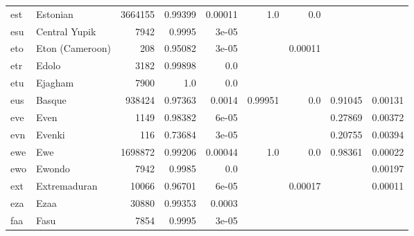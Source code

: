 \documentclass[11pt]{article}
\begin{document}
\begin{table*}[h]
{\begin{tabular}{llrrrrrrr}
est         & Estonian         & 3664155         & 0.99399         & 0.00011         & 1.0         & 0.0         &          &          \\

esu         & Central Yupik         & 7942         & 0.9995         & 3e-05         &          &          &          &          \\

eto         & Eton (Cameroon)         & 208         & 0.95082         & 3e-05         &          & 0.00011         &          &          \\

etr         & Edolo         & 3182         & 0.99898         & 0.0         &          &          &          &          \\

etu         & Ejagham         & 7900         & 1.0         & 0.0         &          &          &          &          \\

eus         & Basque         & 938424         & 0.97363         & 0.0014         & 0.99951         & 0.0         & 0.91045         & 0.00131         \\

eve         & Even         & 1149         & 0.98382         & 6e-05         &          &          & 0.27869         & 0.00372         \\

evn         & Evenki         & 116         & 0.73684         & 3e-05         &          &          & 0.20755         & 0.00394         \\

ewe         & Ewe         & 1698872         & 0.99206         & 0.00044         & 1.0         & 0.0         & 0.98361         & 0.00022         \\

ewo         & Ewondo         & 7942         & 0.9985         & 0.0         &          &          &          & 0.00197         \\

ext         & Extremaduran         & 10066         & 0.96701         & 6e-05         &          & 0.00017         &          & 0.00011         \\

eza         & Ezaa         & 30880         & 0.99353         & 0.0003         &          &          &          &          \\

faa         & Fasu         & 7854         & 0.9995         & 3e-05         &          &          &          &          \\


\end{tabular}}
\end{table*}
\end{document}
